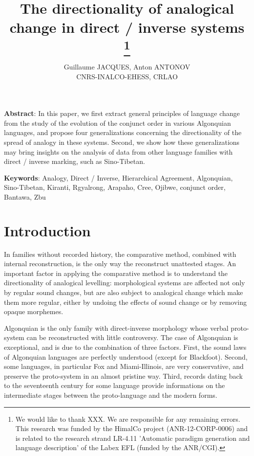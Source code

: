 \documentclass[twoside,a4paper,11pt]{article}
\newcommand{\Σ}{\greek{Σ}}
\begin{document}
\linenumbers
\title{The directionality of analogical change in direct / inverse systems \footnote{We would like to thank XXX. We are responsible for any remaining errors. This research was funded by the HimalCo project (ANR-12-CORP-0006) and is related to the research strand LR-4.11 'Automatic paradigm generation and language description' of the Labex EFL (funded by the ANR/CGI). } }

\author{Guillaume JACQUES, Anton ANTONOV\\ CNRS-INALCO-EHESS, CRLAO}
\maketitle

\textbf{Abstract}: In this paper, we first extract general principles of language change from the study of the evolution of the conjunct order in various Algonquian languages, and propose four generalizations concerning the directionality of the spread of analogy in these systems. Second, we show how these generalizations may bring insights on the analysis of data from other language families with direct / inverse marking, such as Sino-Tibetan.

\textbf{Keywords}: Analogy, Direct / Inverse, Hierarchical Agreement, Algonquian, Sino-Tibetan, Kiranti, Rgyalrong, Arapaho, Cree, Ojibwe, conjunct order, Bantawa, Zbu

\section{Introduction}
In families without recorded history, the comparative method, combined with internal reconstruction, is the only way the reconstruct unattested stages. An important factor in applying the comparative method is to understand the directionality of analogical levelling:  morphological systems are affected not only by regular sound changes, but are also subject to analogical change which make them more regular, either by undoing the effects of sound change or by removing opaque morphemes.

Algonquian is the only family with direct-inverse morphology whose verbal proto-system can be reconstructed with little controversy. The case of Algonquian is exceptional, and is due to the combination of three factors. First, the sound laws of Algonquian languages are perfectly understood (except for Blackfoot). Second, some languages, in particular Fox and Miami-Illinois, are very conservative, and preserve the proto-system in an almost pristine way. Third, records dating back to the seventeenth century for some language provide informations on the intermediate stages between the proto-language and the modern forms.
 
\end{document}
